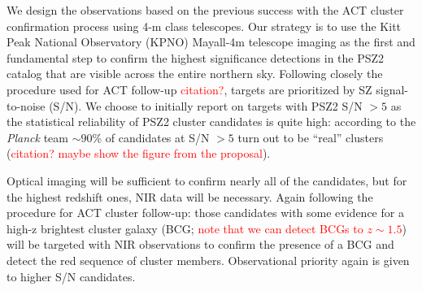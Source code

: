 \documentclass[apj, revtex4-1]{emulateapj}
\newcommand{\editorial}[1]{\textcolor{red}{#1}}
\begin{document}
We design the observations based on the previous success with the ACT cluster confirmation process using 4-m class telescopes. Our strategy is to use the Kitt Peak National Observatory (KPNO) Mayall-4m telescope imaging as the first and fundamental step to confirm the highest significance detections in the PSZ2 catalog that are visible across the entire northern sky. Following closely the procedure used for ACT follow-up \editorial{citation?}, targets are prioritized by SZ signal-to-noise (S/N). We choose to initially report on targets with PSZ2 S/N $>5$ as the statistical reliability of PSZ2 cluster candidates is quite high: according to the \textit{Planck} team $\sim90$\% of candidates at S/N $>5$ turn out to be ``real'' clusters (\editorial{citation? maybe show the figure from the proposal}).

Optical imaging will be sufficient to confirm nearly all of the candidates, but for the highest redshift ones, NIR data will be necessary. Again following the procedure for ACT cluster follow-up: those candidates with some evidence for a high-z brightest cluster galaxy (BCG; \editorial{note that we can detect BCGs to $z \sim 1.5$}) will be targeted with NIR observations to confirm the presence of a BCG and detect the red sequence of cluster members. Observational priority again is given to higher S/N candidates.

\end{document}
